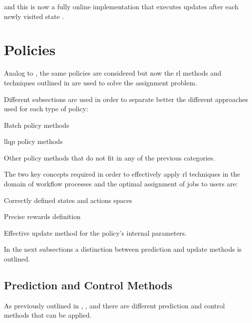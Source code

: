 \documentclass[draft=false]{seal_thesis}
\begin{document}
and this is now a fully online implementation that executes updates after each newly visited state \citep[p. 274]{Sutton2017}. 

\section{ Policies}
\label{sec:rl_policies}

Analog to , the same policies are considered but now the \gls{rl} methods and techniques outlined in  are used to solve the assignment problem.

Different subsections are used in order to separate better the different approaches used for each type of policy:
\begin{enumerate*}
	\item Batch policy methods
	\item \gls{llqp} policy methods
	\item Other policy methods that do not fit in any of the previous categories.
\end{enumerate*}

The two key concepts required in order to effectively apply \gls{rl} techniques in the domain of workflow processes and the optimal assignment of jobs to users are:
\begin{enumerate*}
	\item Correctly defined states and actions spaces
	\item Precise rewards definition
	\item Effective update method for the policy's internal parameters. 
\end{enumerate*}

In the next subsections a distinction between prediction and update methods is outlined.

\subsection{Prediction and Control Methods}

As previously outlined in , ,  and  there are different prediction and control methods that can be applied.

\subsubsection{}
\end{document}

